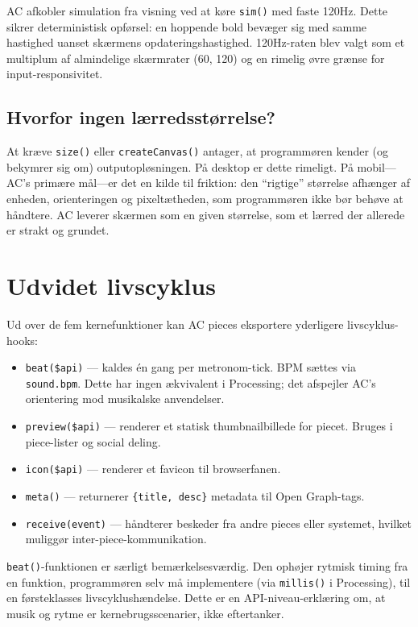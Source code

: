 \documentclass[10pt,letterpaper,twocolumn]{article}
\begin{document}
AC afkobler simulation fra visning ved at køre \texttt{sim()} med faste 120Hz. Dette sikrer deterministisk opførsel: en hoppende bold bevæger sig med samme hastighed uanset skærmens opdateringshastighed. 120Hz-raten blev valgt som et multiplum af almindelige skærmrater (60, 120) og en rimelig øvre grænse for input-responsivitet.

\subsection{Hvorfor ingen lærredsstørrelse?}

At kræve \texttt{size()} eller \texttt{createCanvas()} antager, at programmøren kender (og bekymrer sig om) outputopløsningen. På desktop er dette rimeligt. På mobil---AC's primære mål---er det en kilde til friktion: den ``rigtige'' størrelse afhænger af enheden, orienteringen og pixeltætheden, som programmøren ikke bør behøve at håndtere. AC leverer skærmen som en given størrelse, som et lærred der allerede er strakt og grundet.


\section{Udvidet livscyklus}
\label{sec:extended}

Ud over de fem kernefunktioner kan AC pieces eksportere yderligere livscyklus-hooks:

\begin{itemize}
  \item \texttt{beat(\$api)} --- kaldes én gang per metronom-tick. BPM sættes via \texttt{sound.bpm}. Dette har ingen ækvivalent i Processing; det afspejler AC's orientering mod musikalske anvendelser.
  \item \texttt{preview(\$api)} --- renderer et statisk thumbnailbillede for piecet. Bruges i piece-lister og social deling.
  \item \texttt{icon(\$api)} --- renderer et favicon til browserfanen.
  \item \texttt{meta()} --- returnerer \texttt{\{title, desc\}} metadata til Open Graph-tags.
  \item \texttt{receive(event)} --- håndterer beskeder fra andre pieces eller systemet, hvilket muliggør inter-piece-kommunikation.
\end{itemize}

\texttt{beat()}-funktionen er særligt bemærkelsesværdig. Den ophøjer rytmisk timing fra en funktion, programmøren selv må implementere (via \texttt{millis()} i Processing), til en førsteklasses livscyklushændelse. Dette er en API-niveau-erklæring om, at musik og rytme er kernebrugsscenarier, ikke eftertanker.
\end{document}
